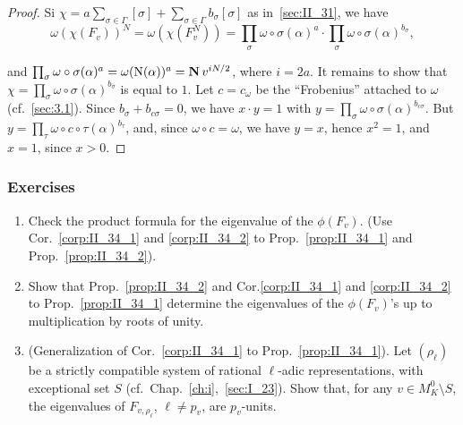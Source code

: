 \begin{proof}
Si $\chi = a \sum_{\sigma \in \Gamma} [\sigma] + \sum_{\sigma \in \Gamma}
b_\sigma[\sigma]$ as in~\ref{sec:II_31}, we have
\[
\omega(\chi(F_v))^N = \omega(\chi(F_v^N))
= \prod_{\sigma} \omega \circ \sigma(\alpha)^a \cdot \prod_{\sigma} 
\omega \circ \sigma(\alpha)^{b_\sigma},
\]

\dpage
and $ \prod_{\sigma} \omega \circ \sigma(\alpha)^a = \omega(\operatorname{N}(\alpha))^a
= \operatorname{\mathbf{N}} v^{i N/2}$, where $i = 2a$. It remains to show that 
$\chi = \prod_{\sigma} \omega \circ \sigma(\alpha)^{b_\sigma}$ is equal to $1$. 
Let $c = c_\omega$ be the ``Frobenius'' attached to $\omega$ (cf.~\ref{sec:3.1}). 
Since $b_\sigma + b_{c \sigma} = 0$, we have $x \cdot y = 1$ with 
$y = \prod_{\sigma} \omega \circ \sigma(\alpha)^{b_{c\sigma}}$. But 
$y = \prod_{\tau} \omega \circ c \circ \tau(\alpha)^{b_\tau}$, and, since 
$\omega \circ c = \omega$, we have $y = x$, hence $x^2 = 1$, and $x = 1$, 
since $x > 0$.
\end{proof}

\subsubsection*{Exercises}
\begin{enumerate}
	\item Check the product formula for the eigenvalue of the $\phi(F_v)$. 
(Use Cor.~\ref{corp:II_34_1} and \ref{corp:II_34_2} to Prop.~\ref{prop:II_34_1}
and Prop.~\ref{prop:II_34_2}).
	\item Show that Prop.~\ref{prop:II_34_2} and Cor.\ref{corp:II_34_1} and
\ref{corp:II_34_2} to Prop.~\ref{prop:II_34_1} determine the eigenvalues of the
$\phi(F_v)$'s up to multiplication by roots of unity. 
	\item (Generalization of Cor.~\ref{corp:II_34_1} to
Prop.~\ref{prop:II_34_1}). Let $(\rho_\ell)$ be a strictly compatible system of
rational $\ell$-adic representations, with exceptional set $S$ (cf.\
Chap.~\ref{ch:i},~\ref{sec:I_23}). Show that, for any $v \in M_K^0 \setminus
S$, the eigenvalues of $F_{v,\rho_\ell}$, $\ell \neq p_v$, are $p_v$-units.
\end{enumerate}

